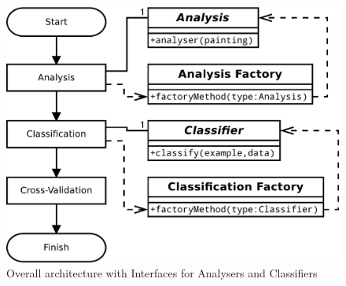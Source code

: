 \begin{figure}[h]
\centering
\includegraphics[width=\linewidth]{img/interfaces-arch}
\caption{Overall architecture with Interfaces for Analysers and Classifiers}\label{fig:interfaces-arch}
\end{figure}


